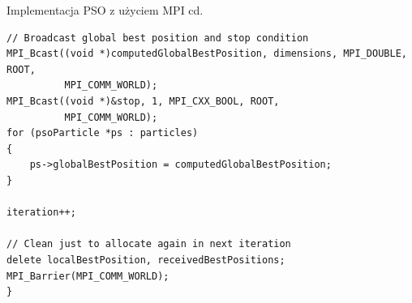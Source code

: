 \documentclass[handout]{beamer}
\begin{document}
\begin{frame}[fragile]{Implementacja PSO z użyciem MPI cd.}

\vspace{-.8cm}

\begin{lstlisting}[style=mycpp, caption={MPI -- PSO cd. \textit{typedef}}]
// Broadcast global best position and stop condition
MPI_Bcast((void *)computedGlobalBestPosition, dimensions, MPI_DOUBLE, ROOT,
          MPI_COMM_WORLD);
MPI_Bcast((void *)&stop, 1, MPI_CXX_BOOL, ROOT,
          MPI_COMM_WORLD);
for (psoParticle *ps : particles)
{
    ps->globalBestPosition = computedGlobalBestPosition;
}

iteration++;

// Clean just to allocate again in next iteration
delete localBestPosition, receivedBestPositions;
MPI_Barrier(MPI_COMM_WORLD);
}

\end{lstlisting}
\end{frame}
\end{document}
